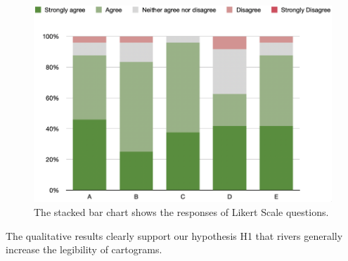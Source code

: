     {
        \begin{figure}[b!]
            \centering
            \includegraphics[width=\columnwidth,keepaspectratio]{figure/evaluation/likert.png}
            \caption{The stacked bar chart shows the responses of Likert Scale questions.}
            \label{fig:likert}
        \end{figure}
    }

The qualitative results clearly support our hypothesis H1 that rivers generally increase the legibility of cartograms.